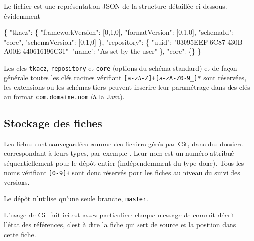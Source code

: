 \documentclass[11pt]{article}
\newenvironment{Shaded}{}{}
\newcommand{\DataTypeTok}[1]{\textcolor[rgb]{0.56,0.13,0.00}{{#1}}}
\newcommand{\DecValTok}[1]{\textcolor[rgb]{0.25,0.63,0.44}{{#1}}}
\newcommand{\StringTok}[1]{\textcolor[rgb]{0.25,0.44,0.63}{{#1}}}
\newcommand{\NormalTok}[1]{{#1}}
\begin{document}
Le fichier  est une représentation JSON de
la structure détaillée ci-dessous. évidemment

\begin{Shaded}
\begin{Highlighting}[]
\NormalTok{\{}
    \DataTypeTok{"tkacz"}\NormalTok{: \{}
        \DataTypeTok{"frameworkVersion"}\NormalTok{: [}\DecValTok{0}\NormalTok{,}\DecValTok{1}\NormalTok{,}\DecValTok{0}\NormalTok{],}
        \DataTypeTok{"formatVersion"}\NormalTok{:    [}\DecValTok{0}\NormalTok{,}\DecValTok{1}\NormalTok{,}\DecValTok{0}\NormalTok{],}
        \DataTypeTok{"schemaId"}\NormalTok{:         }\StringTok{"core"}\NormalTok{,}
        \DataTypeTok{"schemaVersion"}\NormalTok{:    [}\DecValTok{0}\NormalTok{,}\DecValTok{1}\NormalTok{,}\DecValTok{0}\NormalTok{]}
    \NormalTok{\},}
    \DataTypeTok{"repository"}\NormalTok{: \{}
        \DataTypeTok{"uuid"}\NormalTok{:             }\StringTok{"03095EEF-6C87-430B-A00E-440616196C31"}\NormalTok{,}
        \DataTypeTok{"name"}\NormalTok{:             }\StringTok{"As set by the user"}
    \NormalTok{\},}
    \DataTypeTok{"core"}\NormalTok{: \{\}}
\NormalTok{\}}
\end{Highlighting}
\end{Shaded}

Les clés \texttt{tkacz}, \texttt{repository} et \texttt{core} (options
du schéma standard) et de façon générale toutes les clés racines
vérifiant \texttt{{[}a-zA-Z{]}+{[}a-zA-Z0-9\_{]}*} sont réservées, les
extensions ou les schémas tiers peuvent inscrire leur paramétrage dans
des clés au format \texttt{com.domaine.nom} (à la Java).

\subsection{Stockage des fiches}\label{stockage-des-fiches}

Les fiches sont sauvegardées comme des fichiers gérés par Git, dans des
dossiers correspondant à leurs types, par exemple
. Leur nom est un numéro attribué
séquentiellement pour le dépôt entier (indépendemment du type donc).
Tous les noms vérifiant \texttt{{[}0-9{]}+} sont donc réservés pour les
fiches au niveau du suivi des versions.

Le dépôt n'utilise qu'une seule branche, \texttt{master}.

L'usage de Git fait ici est assez particulier: chaque message de commit
décrit l'état des références, c'est à dire la fiche qui sert de source
et la position dans cette fiche.
\end{document}
